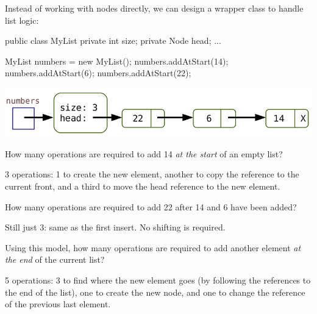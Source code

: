 Instead of working with nodes directly, we can design a wrapper class to handle list logic:

\vspace{1ex}
\begin{minipage}{0.40\linewidth}
\begin{javalst}
    public class MyList
    {
        private int size;
        private Node head;
        ...
    }
\end{javalst}
\end{minipage}
\hfill
\begin{minipage}{0.58\linewidth}
\begin{javalst}
    MyList numbers = new MyList();
    numbers.addAtStart(14);
    numbers.addAtStart(6);
    numbers.addAtStart(22);
\end{javalst}
\includegraphics[scale=0.35]{figs/list3.png}
\end{minipage}
\vspace{1ex}




\Q How many operations are required to add 14 \textit{at the start} of an empty list?

\begin{answer}
3 operations: 1 to create the new element, another to copy the reference to the current front, and a third to move the head reference to the new element.
\end{answer}


\Q How many operations are required to add 22 after 14 and 6 have been added?

\begin{answer}
Still just 3: same as the first insert. No shifting is required.
\end{answer}


\Q Using this model, how many operations are required to add another element \textit{at the end} of the current list?

\begin{answer}
5 operations: 3 to find where the new element goes (by following the references to the end of the list), one to create the new node, and one to change the reference of the previous last element.
\end{answer}


